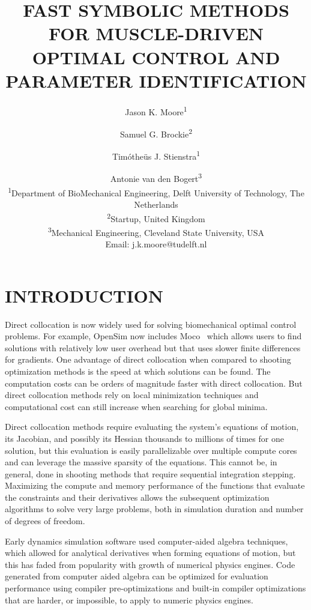 \documentclass[11pt,twocolumn]{article}
\title{\textbf{
  FAST SYMBOLIC METHODS FOR MUSCLE-DRIVEN\\
  OPTIMAL CONTROL AND PARAMETER IDENTIFICATION
}}
\author{
Jason K. Moore\textsuperscript{1}\and
Samuel G. Brockie\textsuperscript{2}\and
Timótheüs J. Stienstra\textsuperscript{1}\and
Antonie van den Bogert\textsuperscript{3}\\
\textsuperscript{1}Department of BioMechanical Engineering, Delft University of Technology, The Netherlands\\
\textsuperscript{2}Startup, United Kingdom\\
\textsuperscript{3}Mechanical Engineering, Cleveland State University, USA\\
Email: j.k.moore@tudelft.nl}
\date{}
\begin{document}
\pagestyle{fancy}
\lhead{}
\maketitle
\section*{INTRODUCTION}
%
Direct collocation is now widely used for solving biomechanical optimal control
problems. For example, OpenSim now includes Moco~\cite{Dembia2019} which allows
users to find solutions with relatively low user overhead but that uses slower
finite differences for gradients. One advantage of direct collocation when
compared to shooting optimization methods is the speed at which solutions can be
found. The computation costs can be orders of magnitude faster with direct
collocation. But direct collocation methods rely on local minimization
techniques and computational cost can still increase when searching for global
minima.

Direct collocation methods require evaluating the system's equations of motion,
its Jacobian, and possibly its Hessian thousands to millions of times for one
solution, but this evaluation is easily parallelizable over multiple compute
cores and can leverage the massive sparsity of the equations. This cannot be, in
general, done in shooting methods that require sequential integration stepping.
Maximizing the compute and memory performance of the functions that evaluate the
constraints and their derivatives allows the subsequent optimization algorithms
to solve very large problems, both in simulation duration and number of degrees
of freedom.

Early dynamics simulation software used computer-aided algebra techniques, which
allowed for analytical derivatives when forming equations of motion, but this
has faded from popularity with growth of numerical physics engines. Code
generated from computer aided algebra can be optimized for evaluation
performance using compiler pre-optimizations and built-in compiler optimizations
that are harder, or impossible, to apply to numeric physics engines.
\end{document}
